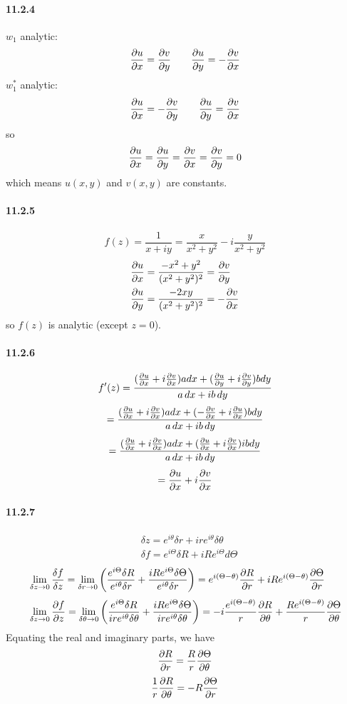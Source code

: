 \documentclass[a4paper]{article}
\begin{document}
\paragraph{11.2.4}
$w_1$ analytic:
\[
\frac{\partial u}{\partial x}=\frac{\partial v}{\partial y}\qquad \frac{\partial u}{\partial y}=-\frac{\partial v}{\partial x}
\]
$w_1^*$ analytic:
\[
\frac{\partial u}{\partial x}=-\frac{\partial v}{\partial y}\qquad \frac{\partial u}{\partial y}=\frac{\partial v}{\partial x}
\]
so 
\[
\frac{\partial u}{\partial x}=\frac{\partial u}{\partial y}=\frac{\partial v}{\partial x}=\frac{\partial v}{\partial y}=0
\]
which means $u(x,y)$ and $v(x,y)$ are constants.

\paragraph{11.2.5}
\[
f(z)=\frac{1}{x+iy}=\frac{x}{x^2+y^2}-i\frac{y}{x^2+y^2}
\]
\begin{align*}
    & \frac{\partial u}{\partial x}=\frac{-x^2+y^2}{(x^2+y^2)^2}=\frac{\partial v}{\partial y}\\
    & \frac{\partial u}{\partial y}=\frac{-2xy}{(x^2+y^2)^2}=-\frac{\partial v}{\partial x}
\end{align*}
so $f(z)$ is analytic (except $z=0$).

\paragraph{11.2.6}
\[
f'(z)=\frac{(\frac{\partial u}{\partial x}+i\frac{\partial v}{\partial x})adx+(\frac{\partial u}{\partial y}+i\frac{\partial v}{\partial y})bdy}{a\,dx+ib\,dy}
\]
\[
=\frac{(\frac{\partial u}{\partial x}+i\frac{\partial v}{\partial x})adx+(-\frac{\partial v}{\partial x}+i\frac{\partial u}{\partial x})bdy}{a\,dx+ib\,dy}
\]
\[
=\frac{(\frac{\partial u}{\partial x}+i\frac{\partial v}{\partial x})adx+(\frac{\partial u}{\partial x}+i\frac{\partial v}{\partial x})ibdy}{a\,dx+ib\,dy}
\]
\[
=\frac{\partial u}{\partial x}+i\frac{\partial v}{\partial x}
\]

\paragraph{11.2.7}
\begin{align*}
    & \delta z=e^{i\theta}\delta r+ire^{i\theta}\delta\theta\\
    & \delta f=e^{i\Theta}\delta R+iRe^{i\Theta}d\Theta
\end{align*}
\begin{align*}
    & \lim_{\delta z\to0}\frac{\delta f}{\delta z}=\lim_{\delta r\to0}\left(\frac{e^{i\Theta}\delta R}{e^{i\theta}\delta r}+\frac{iRe^{i\Theta}\delta\Theta}{e^{i\theta}\delta r} \right)=e^{i(\Theta-\theta)}\frac{\partial R}{\partial r}+iRe^{i(\Theta-\theta)}\frac{\partial\Theta}{\partial r}\\[3pt] 
    & \lim_{\delta z\to0}\frac{\partial f}{\partial z}=\lim_{\delta\theta\to0}\left(\frac{e^{i\Theta}\delta R}{ire^{i\theta}\delta\theta}+\frac{iRe^{i\Theta}\delta\Theta}{ire^{i\theta}\delta\theta} \right)=-i\frac{e^{i(\Theta-\theta)}}{r}\frac{\partial R}{\partial\theta}+\frac{Re^{i(\Theta-\theta)}}{r}\frac{\partial\Theta}{\partial\theta}
\end{align*}
Equating the real and imaginary parts, we have 
\[
\frac{\partial R}{\partial r}=\frac{R}{r}\frac{\partial\Theta}{\partial\theta}
\]
\[
\frac{1}{r}\frac{\partial R}{\partial\theta}=-R\frac{\partial\Theta}{\partial r}
\]
\end{document}
